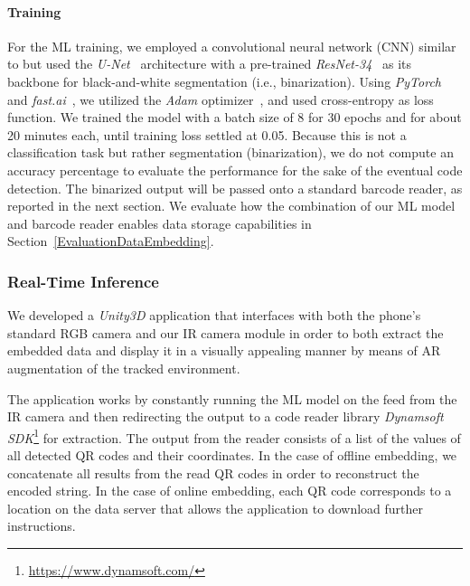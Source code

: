 \paragraph{Training}
For the ML training, we employed a convolutional neural network (CNN) similar to \cite{dogan_sensicut_2021} but used the \textit{U-Net}~\cite{ronneberger_u-net_2015} architecture with a pre-trained \textit{ResNet-34}~\cite{he_deep_2015} as its backbone for black-and-white segmentation (i.e., binarization).
Using \textit{PyTorch}~\cite{paszke_pytorch_2019} and \textit{fast.ai}~\cite{howard_fastai_2020}, we utilized the \textit{Adam} optimizer~\cite{kingma_adam_2017}, and used cross-entropy as loss function.
We trained the model with a batch size of 8 for 30 epochs and for about 20 minutes each,  until training loss settled at 0.05. 
Because this is not a classification task but rather segmentation (binarization), we do not compute an accuracy percentage to evaluate the performance for the sake of the eventual code detection.
The binarized output will be passed onto a standard barcode reader, as reported in the next section.
We evaluate how the combination of our ML model and barcode reader enables data storage capabilities in Section~\ref{EvaluationDataEmbedding}.









\subsubsection{Real-Time Inference}
\label{RealTimeInference}

We developed a \textit{Unity3D} application that interfaces with both the phone's standard RGB camera and our IR camera module in order to both extract the embedded data and display it in a visually appealing manner by means of AR augmentation of the tracked environment.

The application works by constantly running the ML model on the feed from the IR camera and then redirecting the output to a code reader library \textit{Dynamsoft SDK}\footnote{\url{https://www.dynamsoft.com/}} for extraction. The output from the reader consists of a list of the values of all detected QR codes and their coordinates.
In the case of offline embedding, we concatenate all results from the read QR codes in order to reconstruct the encoded string. In the case of online embedding, each QR code corresponds to a location on the data server that allows the application to download further instructions.


